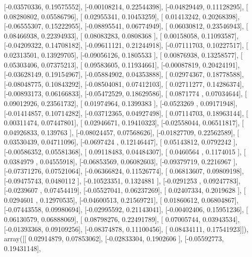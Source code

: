 \documentclass{article}
\begin{document}
       [-0.03570336,  0.19575552],
       [-0.00108214,  0.22544398],
       [-0.04829449,  0.11128295],
       [ 0.08280802,  0.05586796],
       [ 0.02955341,  0.10453259],
       [ 0.01413242,  0.20268398],
       [-0.06555307,  0.15222955],
       [-0.08895541,  0.06774949],
       [ 0.06030812,  0.23546943],
       [ 0.08466938,  0.22394933],
       [ 0.08083283,  0.0808368 ],
       [ 0.00158058,  0.11093587],
       [-0.04209322,  0.14708182],
       [-0.09611121,  0.21244918],
       [-0.07111703,  0.10227517],
       [ 0.02313501,  0.13929705],
       [-0.09056126,  0.1805533 ],
       [ 0.00876938,  0.13258577],
       [ 0.05303406,  0.07375213],
       [ 0.09583605,  0.11934661],
       [-0.00087819,  0.20424191],
       [-0.03628149,  0.19154967],
       [-0.05884902,  0.04353888],
       [ 0.02974367,  0.18778588],
       [-0.08048775,  0.10843292],
       [-0.08504081,  0.07412103],
       [ 0.02711277,  0.14286374],
       [-0.00893173,  0.06166833],
       [-0.05472529,  0.18629586],
       [ 0.0871774 ,  0.07034644],
       [ 0.09012926,  0.23561732],
       [ 0.01974964,  0.1399383 ],
       [-0.0523269 ,  0.09171948],
       [-0.01414857,  0.10714282],
       [-0.03712365,  0.04927498],
       [ 0.07114703,  0.18963144],
       [ 0.00311474,  0.07447801],
       [ 0.02946671,  0.19410323],
       [-0.02558044,  0.06511817],
       [ 0.04926833,  0.139763  ],
       [-0.08024457,  0.07568626],
       [-0.01827709,  0.22562589],
       [ 0.03530439,  0.04711096],
       [-0.0697424 ,  0.12146447],
       [ 0.05143812,  0.0792242 ],
       [-0.00586352,  0.05581368],
       [ 0.09118483,  0.04484307],
       [ 0.0460564 ,  0.1174015 ],
       [ 0.0384979 ,  0.04555918],
       [-0.06853569,  0.06082603],
       [-0.09379719,  0.2216967 ],
       [-0.07371276,  0.07521064],
       [-0.06366824,  0.11526774],
       [ 0.06813607,  0.09809198],
       [-0.09475743,  0.0480112 ],
       [-0.10523351,  0.1324881 ],
       [-0.0291253 ,  0.09247783],
       [-0.0239607 ,  0.07454419],
       [-0.05527041,  0.06237269],
       [ 0.02407334,  0.2019628 ],
       [ 0.0294601 ,  0.12970535],
       [-0.04600513,  0.21569721],
       [ 0.01860612,  0.06804867],
       [-0.07443558,  0.09980694],
       [-0.02995592,  0.21143041],
       [-0.00402406,  0.15951236],
       [ 0.06130579,  0.06888069],
       [ 0.08798276,  0.22491789],
       [ 0.07005744,  0.03943534],
       [-0.01393368,  0.09109256],
       [-0.08374878,  0.11100456],
       [ 0.08434111,  0.17541923]]), array([[ 0.02914879,  0.07853062],
       [-0.02833304,  0.1902606 ],
       [-0.05592773,  0.19431148],
\end{document}
